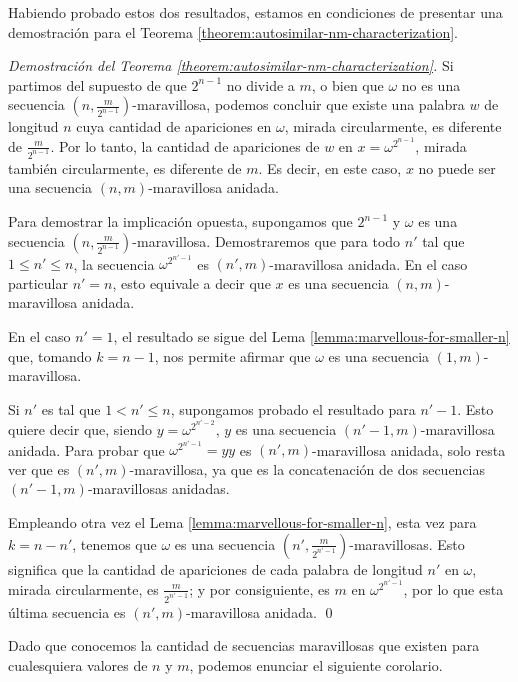 \documentclass[11pt]{article}
\begin{document}
Habiendo probado estos dos resultados, estamos en condiciones de presentar una
demostración para el Teorema \ref{theorem:autosimilar-nm-characterization}.

\begin{proof}[Demostración del Teorema \ref{theorem:autosimilar-nm-characterization}]
	Si partimos del supuesto de que $2^{n-1}$ no divide a $m$, o bien que
	$\omega$ no es una secuencia $\left( n, \frac{m}{2^{n-1}}
		\right)$-maravillosa,
	podemos concluir que existe una palabra $w$ de longitud $n$ cuya
	cantidad de
	apariciones en $\omega$, mirada circularmente, es diferente de
	$\frac{m}{2^{n-1}}$.
	Por lo tanto, la cantidad de apariciones de $w$ en $x = \omega^{2^{n-1}}$,
	mirada también circularmente, es diferente de $m$.
	Es decir, en este caso, $x$ no puede ser una secuencia $(n,m)$-maravillosa
	anidada.

	Para demostrar la implicación opuesta, supongamos que $2^{n-1}$ y $\omega$ es
	una secuencia $\left( n, \frac{m}{2^{n-1}} \right)$-maravillosa.
	Demostraremos que para todo $n'$ tal que $1 \leq n' \leq n$, la secuencia
	$\omega^{2^{n'-1}}$ es $(n',m)$-maravillosa anidada.
	En el caso particular $n' = n$, esto equivale a decir que $x$ es una secuencia
	$(n,m)$-maravillosa anidada.

	En el caso $n' = 1$, el resultado se sigue del Lema
	\ref{lemma:marvellous-for-smaller-n} que, tomando $k = n-1$, nos permite
	afirmar que $\omega$ es una secuencia $(1,m)$-maravillosa.

	Si $n'$ es tal que $1 < n' \leq n$, supongamos probado el resultado para
	$n'-1$.
	Esto quiere decir que, siendo $y = \omega^{2^{n' - 2}}$, $y$ es una secuencia
	$(n'-1, m)$-maravillosa anidada.
	Para probar que $\omega^{2^{n' - 1}} = yy$ es $(n',m)$-maravillosa anidada,
	solo resta ver que es $(n',m)$-maravillosa, ya que es la concatenación de dos
	secuencias $(n'-1, m)$-maravillosas anidadas.

	Empleando otra vez el Lema \ref{lemma:marvellous-for-smaller-n}, esta vez para
	$k = n - n'$, tenemos que $\omega$ es una secuencia $\left( n', \frac{m}{2^{n'
				- 1}} \right)$-maravillosas.
	Esto significa que la cantidad de apariciones de cada palabra de longitud $n'$
	en $\omega$, mirada circularmente, es $\frac{m}{2^{n' - 1}}$; y por
	consiguiente, es $m$ en $\omega^{2^{n'-1}}$, por lo que esta última secuencia
	es $(n',m)$-maravillosa anidada.
	\qed
\end{proof}

Dado que conocemos la cantidad de secuencias maravillosas que existen para
cualesquiera valores de $n$ y $m$, podemos enunciar el siguiente corolario.
\end{document}
